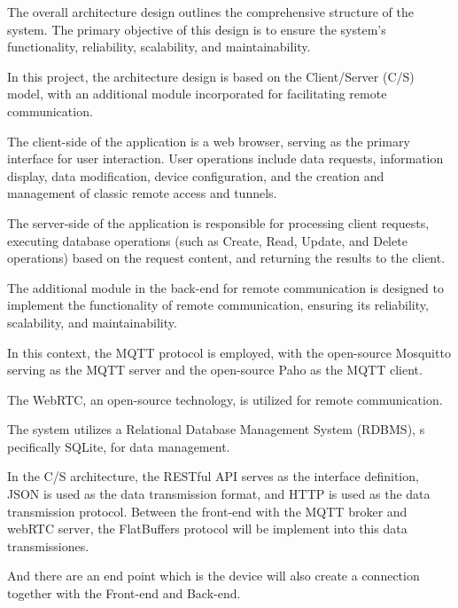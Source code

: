 
The overall architecture design outlines the comprehensive structure of the system. 
The primary objective of this design is to ensure the system's functionality, 
reliability, scalability, and maintainability.

In this project, the architecture design is based on the Client/Server (C/S) model, 
with an additional module incorporated for facilitating remote communication.

The client-side of the application is a web browser, serving as the primary interface 
for user interaction. User operations include data requests, information display, 
data modification, device configuration, and the creation 
and management of classic remote access and tunnels.

The server-side of the application is responsible for processing client requests, 
executing database operations (such as Create, Read, Update, and Delete operations) 
based on the request content, and returning the results to the client.

The additional module in the back-end for remote communication is designed to implement 
the functionality of remote communication, ensuring its reliability, scalability, 
and maintainability. 

In this context, the MQTT protocol is employed, 
with the open-source Mosquitto serving as the MQTT server 
and the open-source Paho as the MQTT client. 

The WebRTC, an open-source technology, 
is utilized for remote communication.

The system utilizes a Relational Database Management System (RDBMS), s
pecifically SQLite, for data management.

In the C/S architecture, the RESTful API serves as the interface definition, 
JSON is used as the data transmission format, 
and HTTP is used as the data transmission protocol.
Between the front-end with the MQTT broker and webRTC server, the FlatBuffers protocol
will be implement into this data transmissiones. 

And there are an end point which is the device will also create a connection together
with the Front-end and Back-end.
